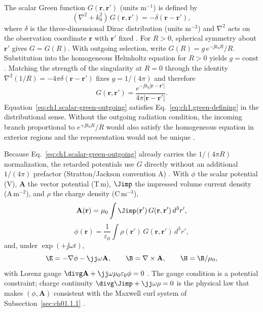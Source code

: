 The scalar Green function $G(\mathbf{r},\mathbf{r}')$ (units m\(^{-1}\)) is defined by
\begin{equation}
\label{eq:ch1.green-defining}
(\nabla^2+k_0^2)\,G(\mathbf{r},\mathbf{r}')=-\delta(\mathbf{r}-\mathbf{r}'),
\end{equation}
where $\delta$ is the three-dimensional Dirac distribution (units m\(^{-3}\)) and $\nabla^2$ acts on the observation coordinate $\mathbf{r}$ with $\mathbf{r}'$ fixed \cite{stratton1941,jackson1999}. For $R>0$, spherical symmetry about $\mathbf{r}'$ gives $G=G(R)$. With outgoing selection, write $G(R)=g\,e^{-\jj k_0 R}/R$. Substitution into the homogeneous Helmholtz equation for $R>0$ yields $g=\mathrm{const}$. Matching the strength of the singularity at $R=0$ through the identity $\nabla^2(1/R)=-4\pi\delta(\mathbf{r}-\mathbf{r}')$ fixes $g=1/(4\pi)$ and therefore
\begin{equation}
\label{eq:ch1.scalar-green-outgoing}
G(\mathbf{r},\mathbf{r}')
=
\frac{e^{-\jj k_0|\mathbf{r}-\mathbf{r}'|}}{4\pi|\mathbf{r}-\mathbf{r}'|}.
\end{equation}
Equation~\eqref{eq:ch1.scalar-green-outgoing} satisfies Eq.~\eqref{eq:ch1.green-defining} in the distributional sense. Without the outgoing radiation condition, the incoming branch proportional to $e^{+\jj k_0 R}/R$ would also satisfy the homogeneous equation in exterior regions and the representation would not be unique \cite{stratton1941,jackson1999}.

Because Eq.~\eqref{eq:ch1.scalar-green-outgoing} already carries the $1/(4\pi R)$ normalization, the retarded potentials use $G$ directly without an additional $1/(4\pi)$ prefactor (Stratton/Jackson convention A) \cite{stratton1941,jackson1999}. With $\phi$ the scalar potential (V), $\mathbf{A}$ the vector potential (T\,m), $\Jimp$ the impressed volume current density (A\,m$^{-2}$), and $\rho$ the charge density (C\,m$^{-3}$),
\begin{equation}
\label{eq:ch1.vector-potential-retarded}
\mathbf{A}(\mathbf{r})
=
\mu_0\int
\Jimp(\mathbf{r}')\,
G(\mathbf{r},\mathbf{r}')\,
d^3r',
\end{equation}
\begin{equation}
\label{eq:ch1.lorenz-scalar-potential-retarded}
\phi(\mathbf{r})
=
\frac{1}{\varepsilon_0}\int
\rho(\mathbf{r}')\,
G(\mathbf{r},\mathbf{r}')\,
d^3r',
\end{equation}
and, under $\exp(+\jj\omega t)$,
\begin{equation}
\label{eq:ch1.lorenz-field-reconstruction}
\E=-\nabla\phi-\jj\omega\mathbf{A},\qquad \B=\nabla\times\mathbf{A},\qquad \H=\B/\mu_0,
\end{equation}
with Lorenz gauge $\divg\mathbf{A}+\jj\omega\mu_0\varepsilon_0\phi=0$ \cite{stratton1941,jackson1999}. The gauge condition is a potential constraint; charge continuity $\divg\Jimp+\jj\omega\rho=0$ is the physical law that makes $(\phi,\mathbf{A})$ consistent with the Maxwell curl system of Subsection~\ref{sec:ch01.1.1} \cite{maxwell1873,stratton1941}.

